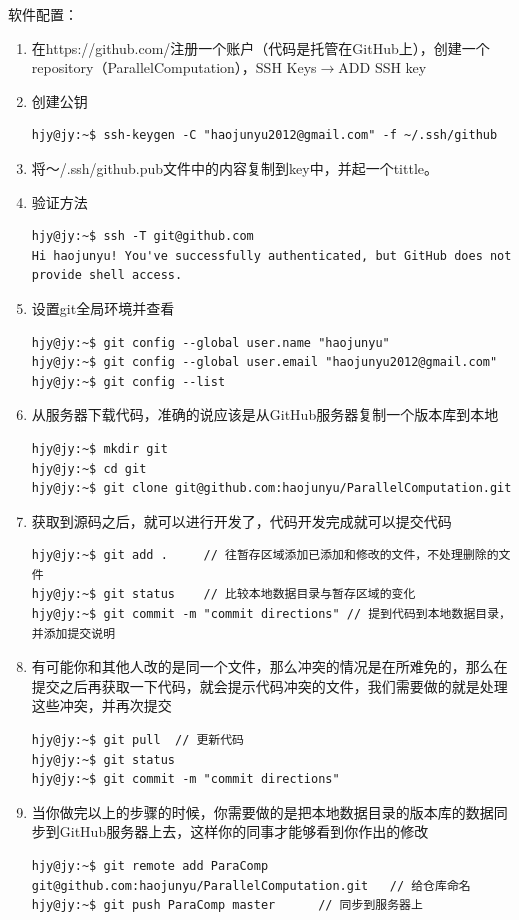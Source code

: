 软件配置：
\begin{enumerate}
\item 在https://github.com/注册一个账户（代码是托管在GitHub上），创建一个repository（ParallelComputation），SSH Keys$\rightarrow{}$ADD SSH key
\item 创建公钥
\begin{lstlisting}[style=BASH]
hjy@jy:~$ ssh-keygen -C "haojunyu2012@gmail.com" -f ~/.ssh/github
\end{lstlisting}
\item 将～/.ssh/github.pub文件中的内容复制到key中，并起一个tittle。
\item 验证方法
\begin{lstlisting}[style=BASH]
hjy@jy:~$ ssh -T git@github.com
Hi haojunyu! You've successfully authenticated, but GitHub does not provide shell access.
\end{lstlisting}
\item 设置git全局环境并查看
\begin{lstlisting}[style=BASH]
hjy@jy:~$ git config --global user.name "haojunyu"
hjy@jy:~$ git config --global user.email "haojunyu2012@gmail.com"
hjy@jy:~$ git config --list
\end{lstlisting}
\item 从服务器下载代码，准确的说应该是从GitHub服务器复制一个版本库到本地
\begin{lstlisting}[style=BASH]
hjy@jy:~$ mkdir git
hjy@jy:~$ cd git
hjy@jy:~$ git clone git@github.com:haojunyu/ParallelComputation.git
\end{lstlisting}
\item 获取到源码之后，就可以进行开发了，代码开发完成就可以提交代码
\begin{lstlisting}[style=BASH]
hjy@jy:~$ git add . 	// 往暂存区域添加已添加和修改的文件，不处理删除的文件
hjy@jy:~$ git status	// 比较本地数据目录与暂存区域的变化	
hjy@jy:~$ git commit -m "commit directions"	// 提到代码到本地数据目录，并添加提交说明
\end{lstlisting}
\item 有可能你和其他人改的是同一个文件，那么冲突的情况是在所难免的，那么在提交之后再获取一下代码，就会提示代码冲突的文件，我们需要做的就是处理这些冲突，并再次提交
\begin{lstlisting}[style=BASH]
hjy@jy:~$ git pull	// 更新代码
hjy@jy:~$ git status	
hjy@jy:~$ git commit -m "commit directions"	
\end{lstlisting}
\item 当你做完以上的步骤的时候，你需要做的是把本地数据目录的版本库的数据同步到GitHub服务器上去，这样你的同事才能够看到你作出的修改
\begin{lstlisting}[style=BASH]
hjy@jy:~$ git remote add ParaComp git@github.com:haojunyu/ParallelComputation.git	// 给仓库命名
hjy@jy:~$ git push ParaComp master		// 同步到服务器上
\end{lstlisting}

\end{enumerate}


